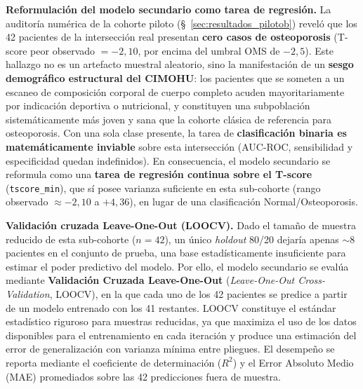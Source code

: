 \documentclass[../tesis.tex]{subfiles}
\begin{document}
\textbf{Reformulación del modelo secundario como tarea de regresión.} La auditoría numérica de la cohorte piloto (§~\ref{sec:resultados_pilotob}) reveló que los 42 pacientes de la intersección real presentan \textbf{cero casos de osteoporosis} (T-score peor observado $= -2{,}10$, por encima del umbral OMS de $-2{,}5$). Este hallazgo no es un artefacto muestral aleatorio, sino la manifestación de un \textbf{sesgo demográfico estructural del CIMOHU}: los pacientes que se someten a un escaneo de composición corporal de cuerpo completo acuden mayoritariamente por indicación deportiva o nutricional, y constituyen una subpoblación sistemáticamente más joven y sana que la cohorte clásica de referencia para osteoporosis. Con una sola clase presente, la tarea de \textbf{clasificación binaria es matemáticamente inviable} sobre esta intersección (AUC-ROC, sensibilidad y especificidad quedan indefinidos). En consecuencia, el modelo secundario se reformula como una \textbf{tarea de regresión continua sobre el T-score} (\texttt{tscore\_min}), que sí posee varianza suficiente en esta sub-cohorte (rango observado $\approx -2{,}10$ a $+4{,}36$), en lugar de una clasificación Normal/Osteoporosis.

\textbf{Validación cruzada Leave-One-Out (LOOCV).} Dado el tamaño de muestra reducido de esta sub-cohorte ($n = 42$), un único \textit{holdout} 80/20 dejaría apenas $\sim$8 pacientes en el conjunto de prueba, una base estadísticamente insuficiente para estimar el poder predictivo del modelo. Por ello, el modelo secundario se evalúa mediante \textbf{Validación Cruzada Leave-One-Out} (\textit{Leave-One-Out Cross-Validation}, LOOCV), en la que cada uno de los 42 pacientes se predice a partir de un modelo entrenado con los 41 restantes. LOOCV constituye el estándar estadístico riguroso para muestras reducidas, ya que maximiza el uso de los datos disponibles para el entrenamiento en cada iteración y produce una estimación del error de generalización con varianza mínima entre pliegues. El desempeño se reporta mediante el coeficiente de determinación ($R^2$) y el Error Absoluto Medio (MAE) promediados sobre las 42 predicciones fuera de muestra.
\end{document}
